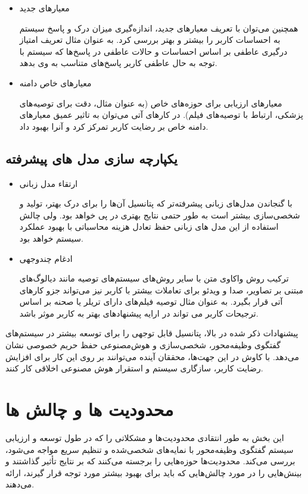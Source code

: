 \begin{itemize}
\item
معیارهای جدید

همچنین می‌توان با تعریف معیارهای جدید، اندازه‌گیری میزان درک و پاسخ سیستم به احساسات کاربر را بیشتر و بهتر بررسی کرد. به عنوان مثال تعریف امتیاز درگیری عاطفی بر اساس احساسات و حالات عاطفی در پاسخ‌ها که سیستم با توجه به حال عاطفی کاربر پاسخ‌های متناسب به وی بدهد.
\item
 معیارهای خاص دامنه

 معیارهای ارزیابی برای حوزه‌های خاص (به عنوان مثال، دقت برای توصیه‌های پزشکی، ارتباط با توصیه‌های فیلم). در کارهای آتی می‌توان به تاثیر عمیق معیارهای دامنه خاص بر رضایت کاربر تمرکز کرد و آنرا بهبود داد.
\end{itemize}

\subsection{یکپارچه سازی مدل های پیشرفته}
\begin{itemize}
\item
ارتقاء مدل زبانی

با گنجاندن مدل‌های زبانی پیشرفته‌تر که پتانسیل آن‌ها را برای درک بهتر، تولید و شخصی‌سازی بیشتر است به طور حتمی نتایج بهتری در پی خواهد بود. ولی چالش استفاده از این مدل های زبانی حفظ تعادل هزینه محاسباتی با بهبود عملکرد سیستم خواهد بود.
\item
ادغام چندوجهی

ترکیب روش واکاوی متن با سایر روش‌های سیستم‌های توصیه مانند دیالوگ‌های مبتنی بر تصاویر، صدا و ویدئو برای تعاملات بیشتر با کاربر نیز می‌تواند جزو کارهای آتی قرار بگیرد. به عنوان مثال توصیه فیلم‌های دارای تریلر یا صحنه بر اساس ترجیحات کاربر می تواند در ارایه پیشنهادهای بهتر به کاربر موثر باشد.
\end{itemize}

پیشنهادات ذکر شده در بالا، پتانسیل قابل توجهی را برای توسعه بیشتر در سیستم‌های گفتگوی وظیفه‌محور، شخصی‌سازی و هوش‌مصنوعی حفظ حریم خصوصی نشان می‌دهد. با کاوش در این جهت‌ها، محققان آینده می‌توانند بر روی این کار برای افزایش رضایت کاربر، سازگاری سیستم و استقرار هوش مصنوعی اخلاقی کار کنند.


\section{محدودیت ها و چالش ها}

این بخش به طور انتقادی محدودیت‌ها و مشکلاتی را که در طول توسعه و ارزیابی سیستم گفتگوی وظیفه‌محور با نمایه‌های شخصی‌شده و تنظیم سریع مواجه می‌شود، بررسی می‌کند. محدودیت‌ها حوزه‌هایی را برجسته می‌کنند که بر نتایج تأثیر گذاشتند و بینش‌هایی را در مورد چالش‌هایی که باید برای بهبود بیشتر مورد توجه قرار گیرند، ارائه می‌دهند.

